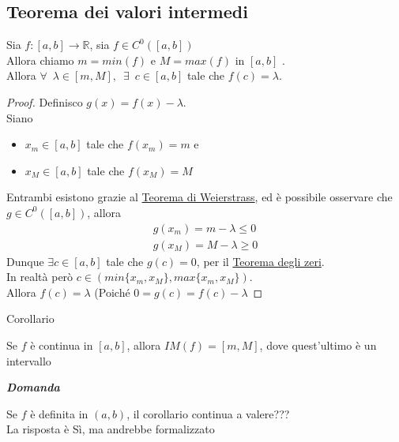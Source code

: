 \documentclass{article}
\theoremstyle{definition}
\begin{document}
\subsection{Teorema dei valori intermedi}
Sia $f: [a,b] \to \mathbb{R}$, sia $f \in C^0([a,b])$
\\
Allora chiamo $m=min(f)$ e $M=max(f)$ in $[a,b]$ .
\\
Allora $\forall \,\,\, \lambda \in [m,M], \,\,\, \exists \,\,\, c \in [a,b]$ tale che $f(c)=\lambda$.
\begin{proof}
    Definisco $g(x)=f(x)-\lambda$.
    \\
    Siano \begin{itemize}
        \item $x_m \in [a,b]$ tale che $f(x_m)=m$ e
        \item $x_M \in [a,b]$ tale che $f(x_M)=M$
    \end{itemize}
    Entrambi esistono grazie al \underline{Teorema di Weierstrass}, ed è possibile osservare che $g \in C^0([a,b])$, allora
    \begin{align*}
        g(x_m)=m-\lambda \leqslant 0 \\
        g(x_M)=M-\lambda \geqslant 0
    \end{align*}
    Dunque $\exists c \in [a,b]$ tale che $g(c)=0$, per il \underline{Teorema degli zeri}.
    \\
    In realtà però $c \in (min\{x_m,x_M\},max\{x_m,x_M\})$.
    \\
    Allora $f(c)=\lambda$ (Poiché $0=g(c)=f(c)-\lambda$
\end{proof}
\begin{center}
    Corollario
\end{center}
Se $f$ è continua in $[a,b]$, allora $IM(f)=[m,M]$, dove quest'ultimo è un intervallo
\begin{center}
    \textbf{\textit{Domanda}}
\end{center}
Se $f$ è definita in $(a,b)$, il corollario continua a valere???
\\
La risposta è Sì, ma andrebbe formalizzato
\end{document}
